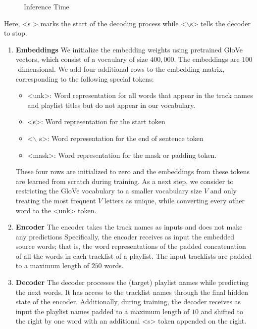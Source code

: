 \documentclass{article} %
\begin{document}
\begin{figure}[ht]
\begin{minipage}[b]{0.45\linewidth}
		\caption{Inference Time}
		\label{fig:figure2}
	\end{minipage}
\end{figure}

Here, {\textless s \textgreater} marks the start of the decoding process while {\textless $\backslash$s\textgreater} tells the decoder to stop.
\begin{enumerate}[label = (\alph*)]
    \item \textbf{Embeddings}
        We initialize the embedding weights using pretrained GloVe vectors, which consist of a vocaulary of size $400,000$. 
		The embeddings are $100$-dimensional.
        We add four additional rows to the embedding matrix, corresponding to the following special tokens: 
        \begin{itemize}
            \item {\textless unk\textgreater}: Word representation for all words that appear in the track names and playlist titles but do not appear in our vocabulary.
            \item {\textless s\textgreater}: Word representation for the start token
            \item {\textless $\backslash$ s\textgreater}: Word representation for the end of sentence token 
            \item {\textless mask\textgreater}: Word representation for the mask or padding token.
        \end{itemize}
        These four rows are initialized to zero and the embeddings from these tokens are learned from scratch during training.
        As a next step, we consider to restricting the GloVe vocabulary to a smaller vocabulary size $V$ and only treating the most frequent $V$ letters as unique, while converting every other word to the {\textless unk\textgreater} token.
    \item \textbf{Encoder}
        The encoder takes the track names as inputs and does not make any predictions
        Specifically, the encoder receives as input the embedded source words; that is, the word representations of the padded concatenation of all the words in each tracklist of a playlist.
        The input tracklists are padded to a maximum length of $250$ words.
    \item \textbf{Decoder}
        The decoder processes the (target) playlist names while predicting the next words.
        It has access to the tracklist names through the final hidden state of the encoder.
        Additionally, during training, the decoder receives as input the playlist names padded to a maximum length of $10$ and shifted to the right by one word with an additional {\textless s\textgreater} token appended on the right. 

\end{enumerate}
\end{document}
